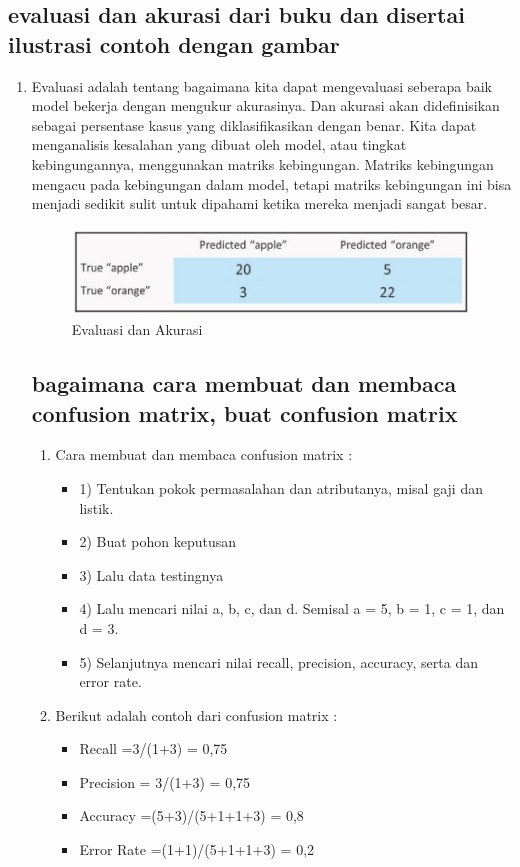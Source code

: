 \begin{enumerate}
\begin{enumerate}
\begin{enumerate}
\begin{enumerate}
\begin{enumerate}
\begin{enumerate}
\begin{enumerate}
\begin{enumerate}
\subsection{evaluasi dan akurasi dari buku dan disertai ilustrasi contoh
dengan gambar}
\begin{enumerate}
\item Evaluasi adalah tentang  bagaimana kita dapat mengevaluasi seberapa baik model bekerja dengan mengukur akurasinya. Dan akurasi akan didefinisikan sebagai persentase kasus yang diklasifikasikan dengan benar. Kita dapat menganalisis kesalahan yang dibuat oleh model, atau tingkat kebingungannya, menggunakan matriks kebingungan. Matriks kebingungan mengacu pada kebingungan dalam model, tetapi matriks kebingungan ini bisa menjadi sedikit sulit untuk dipahami ketika mereka menjadi sangat besar.
\begin{figure}[ht]
\centering
\includegraphics[scale=0.5]{figures/f9.jpg}
\caption{ Evaluasi dan Akurasi}
\label{contoh}
\end{figure}

\subsection{ bagaimana cara membuat dan membaca confusion matrix, buat confusion matrix }
\begin{enumerate}
\item Cara membuat dan membaca confusion matrix :
\begin{itemize}
\item 1)	Tentukan pokok permasalahan dan atributanya, misal gaji dan listik.
\item 2)	Buat pohon keputusan
\item 3)	Lalu data testingnya
\item 4)	Lalu mencari nilai a, b, c, dan d. Semisal a = 5, b = 1, c = 1, dan d = 3.
\item 5)	Selanjutnya mencari nilai recall, precision, accuracy, serta dan error rate.
\end{itemize}
\item Berikut adalah contoh dari confusion matrix :
\begin{itemize}
\item Recall =3/(1+3) = 0,75
\item Precision = 3/(1+3) = 0,75
\item Accuracy =(5+3)/(5+1+1+3) = 0,8
\item Error Rate =(1+1)/(5+1+1+3) = 0,2
\end{itemize}


\end{enumerate}
\end{enumerate}
\end{enumerate}
\end{enumerate}
\end{enumerate}
\end{enumerate}
\end{enumerate}
\end{enumerate}
\end{enumerate}
\end{enumerate}
